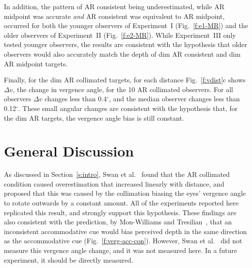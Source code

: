 \documentclass[10pt,journal,compsoc]{IEEEtran}
\makeatletter
\newcommand{\etal}{et al.\@\xspace} %
\newcommand{\ParLabelFirst}[1]{\noindent{\sf\bfseries\small #1}}
\makeatother
\begin{document}
In addition, the pattern of AR consistent being underestimated, while AR midpoint was accurate \emph{and} AR consistent was equivalent to AR midpoint, occurred for both the younger observers of Experiment~I (Fig.~\ref{f:e1-MR}) and the older observers of Experiment~II (Fig.~\ref{f:e2-MR}).  While Experiment~III only tested younger observers, the results are consistent with the hypothesis that older observers would also accurately match the depth of dim AR consistent and dim AR midpoint targets.  

Finally, for the dim AR collimated targets, for each distance Fig.~\ref{f:vdist}c shows $\Delta v$, the change in vergence angle, for the 10 AR collimated observers.  For all observers $\Delta v$ changes less than 0.4$^{\circ}$, and the median observer changes less than 0.12$^{\circ}$.  These small angular changes are consistent with the hypothesis that, for the dim AR targets, the vergence angle bias is still constant.
 
\section {General Discussion}

\ParLabelFirst{Constant Vergence Angle Bias:} As discussed in Section~\ref{s:intro}, Swan \etal~\cite{swan:2015} found that the AR collimated condition caused overestimation that increased linearly with distance, and proposed that this was caused by the collimation biasing the eyes' vergence angle to rotate outwards by a constant amount.  All of the experiments reported here replicated this result, and strongly support this hypothesis.  These findings are also consistent with the prediction, by Mon-Williams and Tresilian~\cite{monwilliams:2000}, that an inconsistent accommodative cue would bias perceived depth in the same direction as the accommodative cue (Fig.~\ref{f:verg-acc-con}).  However, Swan \etal~\cite{swan:2015} did not measure this vergence angle change, and it was not measured here.  In a future experiment, it should be directly measured. 
\end{document}

